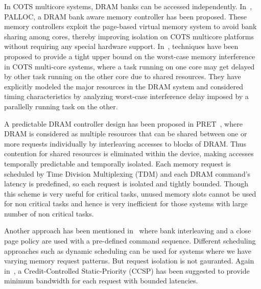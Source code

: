 \noindent
In COTS multicore systems, DRAM banks can be accessed independently. In~\cite{yun2014palloc}, PALLOC, a DRAM bank aware 
memory controller has been proposed. These memory controllers exploit the page-based virtual memory system to avoid bank 
sharing among cores, thereby improving isolation on COTS multicore platforms without requiring any special hardware support. 
In~\cite{kim2014bounding}, techniques have been proposed to provide a tight upper bound on the worst-case memory interference in COTS 
multi-core systems, where a task running on one core may get delayed by other task running on the other core due to shared 
resources. They have explicitly modeled the major resources in the DRAM system and considered timing characteristics by 
analyzing worst-case interference delay imposed by a parallelly running task on the other.

\noindent
A predictable DRAM controller design has been proposed in PRET~\cite{reineke2011pret}, where DRAM is considered as multiple 
resources that can be shared between one or more requests individually by interleaving accesses to blocks of DRAM. Thus 
contention for shared resources is eliminated within the device, making accesses temporally predictable and temporally 
isolated. Each memory request is scheduled by Time Division Multiplexing (TDM) and each DRAM command's latency is predefined, so each request is isolated 
and tightly bounded. Though this scheme is very useful for critical tasks, unused memory slots cannot be used for non critical
tasks and hence is very inefficient for those systems with large number of non critical tasks.

\noindent
Another approach has been mentioned in~\cite{akesson2011architectures} where bank interleaving and a close page policy are used with a pre-defined 
command sequence. Different scheduling approaches such as dynamic scheduling can be used for systems where we have varying 
memory request patterns. But request isolation is not gauranted. Again in~\cite{akesson2008real}, a Credit-Controlled Static-Priority
(CCSP) has been suggested to provide minimum bandwidth for each request with bounded latencies. 

